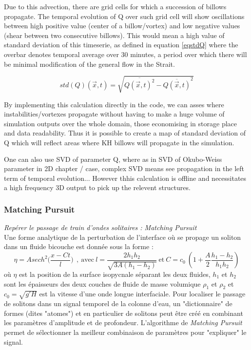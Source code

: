 Due to this advection, there are grid cells for which a succession of billows propagate. The temporal evolution of Q over such grid cell will show oscillations between high positive value (center of a billow/vortex) and low negative values (shear between two consecutive billows). This would mean a high value of standard deviation of this timeserie, as defined in equation \ref{eqstdQ} where the overbar denotes temporal average over 30 minutes, a period over which there will be minimal modification of the general flow in the Strait.

\begin{equation} 
\label{eqstdQ} 
    std ( Q ) (\vec{x},t)=  \sqrt{   \overline{Q (\vec{x},t)^{2}} -  \overline{Q(\vec{x},t)}^{2}       }
\end{equation}

By implementing this calculation directly in the code, we can asses where instabilities/vortexes propagate without having to make a huge volume of simulation outputs over the whole domain, those economising in storage place and data readability. Thus it is possible to create a map of standard deviation of Q which will reflect areas where KH billows will propagate in the simulation.

One can also use SVD of parameter Q, where as in SVD of Okubo-Weiss parameter in 2D chapter / case, complex SVD means see propagation in the left  term of temporal evolution... However thhis calculation is offline and necessitates a high frequency 3D output to pick up the relevent structures.


\subsubsection{Matching Pursuit}
\noindent\textit{Repérer le passage de train d'ondes solitaires : Matching Pursuit}\\
Une forme analytique de la perturbation de l'interface où se propage un soliton dans un fluide bicouche est donnée sous la forme : 
\begin{equation}
\eta = A sech^2\bigg( \frac{x-Ct}{l} \bigg) \ \ , \ \text{avec} \ l = \frac{2h_1h_2}{\sqrt{3A(h_1-h_2)}} \ \text{et} \ C=c_0 \ (1 + \frac{A}{2} \frac{h_1-h_2}{h_1h_2})
\end{equation}
où $\eta$ est la position de la surface isopycnale séparant les deux fluides, $h_1$ et $h_2$ sont les épaisseurs des deux couches de fluide de masse volumique $\rho_1$ et $\rho_2$ et $c_0=\sqrt{g'H}$ est la vitesse d'une onde longue interfaciale.
Pour localiser le passage de solitons dans un signal temporel de la colonne d'eau, un "dictionnaire" de formes (dites "atomes") et en particulier de solitons peut être créé en combinant les paramètres d'amplitude et de profondeur. L'algorithme de \textit{Matching Pursuit} \citep{mallat_1993} permet de sélectionner la meilleur combinaison de paramètres pour "expliquer" le signal.\color{black}


